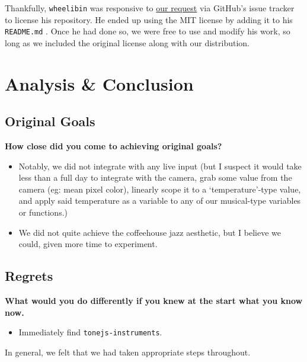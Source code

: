 \documentclass[12pt,a4paper]{article}
\newcommand{\code}{\texttt}
\newcommand{\lightcode}[1]{\colorbox{light-gray}{\texttt{#1}}}
\begin{document}
Thankfully, \code{wheelibin} was responsive to \href{https://github.com/wheelibin/synaesthesia/issues/2}{our request} via GitHub's issue tracker to license his repository. He ended up using the MIT license by adding it to his \lightcode{README.md} \cite{synaesthesia-license}. Once he had done so, we were free to use and modify his work, so long as we included the original license along with our distribution.


\pagebreak
\section{Analysis \& Conclusion}
\subsection{Original Goals}
\textbf{How close did you come to achieving original goals?}
\begin{itemize}
	\item Notably, we did not integrate with any live input (but I suspect it would take less than a full day to integrate with the camera, grab some value from the camera (eg: mean pixel color), linearly scope it to a `temperature'-type value, and apply said temperature as a variable to any of our musical-type variables or functions.)
	\item We did not quite achieve the coffeehouse jazz aesthetic, but I believe we could, given more time to experiment.
\end{itemize}

\subsection{Regrets}
\textbf{What would you do differently if you knew at the start what you know now.}
\begin{itemize}
	\item Immediately find \lightcode{tonejs-instruments}.
\end{itemize}

In general, we felt that we had taken appropriate steps throughout.
\end{document}
